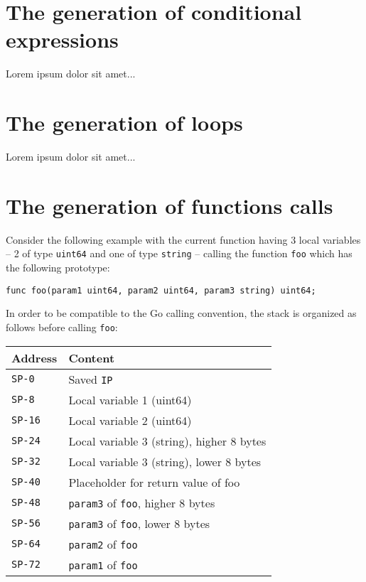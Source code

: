 \documentclass[a4paper]{scrreprt}
\begin{document}
    \section{The generation of conditional expressions}
      Lorem ipsum dolor sit amet...

    \section{The generation of loops}
      Lorem ipsum dolor sit amet...

    \section{The generation of functions calls} \label{The generation of functions}
      Consider the following example with the current function having 3 local variables -- 2 of type \texttt{uint64} and one of type \texttt{string} -- calling the function \texttt{foo} which has the following prototype:
        \begin{lstlisting}
func foo(param1 uint64, param2 uint64, param3 string) uint64;
        \end{lstlisting}
      In order to be compatible to the Go calling convention, the stack is organized as follows before calling \texttt{foo}:
      \begin{table}[h!]
      \begin{tabular}{ll}
        \toprule
        \textbf{Address} & \textbf{Content}\\
        \midrule
        \texttt{SP-0} & Saved \texttt{IP}\\
        \texttt{SP-8} & Local variable 1 (uint64)\\
        \texttt{SP-16} & Local variable 2 (uint64)\\
        \texttt{SP-24} & Local variable 3 (string), higher 8 bytes\\
        \texttt{SP-32} & Local variable 3 (string), lower 8 bytes\\
        \midrule
        \texttt{SP-40} & Placeholder for return value of foo\\
        \texttt{SP-48} & \texttt{param3} of \texttt {foo}, higher 8 bytes\\
        \texttt{SP-56} & \texttt{param3} of \texttt {foo}, lower 8 bytes\\
        \texttt{SP-64} & \texttt{param2} of \texttt {foo}\\
        \texttt{SP-72} & \texttt{param1} of \texttt {foo}\\
        \bottomrule
      \end{tabular}
      \end{table}\\ \\
\end{document}
